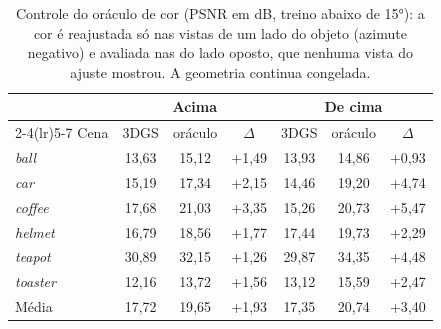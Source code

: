 \begin{table}[t]
\centering
\caption{Controle do oráculo de cor (PSNR em dB, treino abaixo de 15°): a cor é reajustada só nas vistas de um lado do objeto (azimute negativo) e avaliada nas do lado oposto, que nenhuma vista do ajuste mostrou. A geometria continua congelada.}
\label{tab:oposto15}
\setlength{\tabcolsep}{4pt}
\begin{tabular}{l ccc ccc}
\toprule
 & \multicolumn{3}{c}{Acima} & \multicolumn{3}{c}{De cima} \\
\cmidrule(lr){2-4}\cmidrule(lr){5-7}
Cena & 3DGS & oráculo & $\Delta$ & 3DGS & oráculo & $\Delta$ \\
\midrule
\textit{ball} & 13{,}63 & 15{,}12 & +1{,}49 & 13{,}93 & 14{,}86 & +0{,}93 \\
\textit{car} & 15{,}19 & 17{,}34 & +2{,}15 & 14{,}46 & 19{,}20 & +4{,}74 \\
\textit{coffee} & 17{,}68 & 21{,}03 & +3{,}35 & 15{,}26 & 20{,}73 & +5{,}47 \\
\textit{helmet} & 16{,}79 & 18{,}56 & +1{,}77 & 17{,}44 & 19{,}73 & +2{,}29 \\
\textit{teapot} & 30{,}89 & 32{,}15 & +1{,}26 & 29{,}87 & 34{,}35 & +4{,}48 \\
\textit{toaster} & 12{,}16 & 13{,}72 & +1{,}56 & 13{,}12 & 15{,}59 & +2{,}47 \\
\midrule
Média & 17{,}72 & 19{,}65 & +1{,}93 & 17{,}35 & 20{,}74 & +3{,}40 \\
\bottomrule
\end{tabular}
\end{table}
